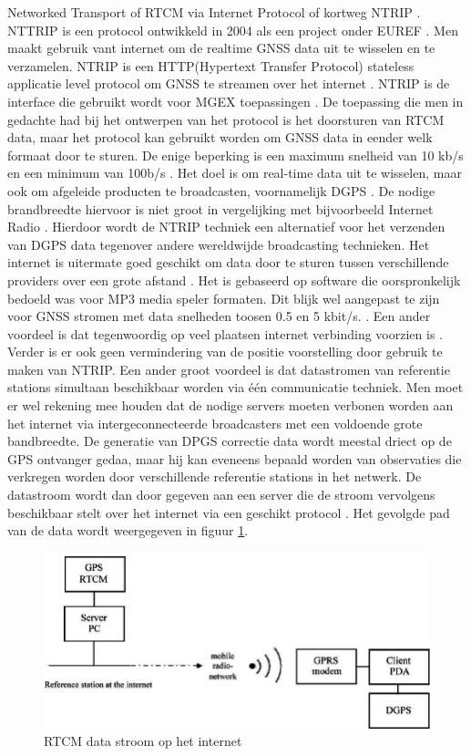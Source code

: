 Networked Transport of RTCM via Internet Protocol of kortweg NTRIP \cite{LBibNTRIP,LBibNTRIP3}. NTTRIP is een protocol ontwikkeld in 2004 \cite{LBibNTRIP3} als een project onder EUREF \cite{LBibNTRIP4}. Men maakt gebruik vant internet om de realtime GNSS data uit te wisselen en te verzamelen. NTRIP is een HTTP(Hypertext Transfer Protocol) stateless applicatie level protocol om GNSS te streamen over het internet \cite{LBibNTRIP}. NTRIP is de interface die gebruikt wordt voor MGEX toepassingen \cite{LBibGNSS9}. De toepassing die men in gedachte had bij het ontwerpen van het protocol is het doorsturen van RTCM data, maar het protocol kan gebruikt worden om GNSS data in eender welk formaat door te sturen. De enige beperking is een maximum snelheid van 10 kb/s en een minimum van 100b/s \cite{LBibNTRIP3}.  Het doel is om real-time data uit te wisselen, maar ook om afgeleide producten te broadcasten, voornamelijk DGPS \cite{LBibNTRIP2}. De nodige brandbreedte hiervoor is niet groot in vergelijking met bijvoorbeeld Internet Radio \cite{LBibNTRIP}. Hierdoor wordt de NTRIP techniek een alternatief voor het verzenden van DGPS data tegenover andere  wereldwijde broadcasting technieken. Het internet is uitermate goed geschikt om data door te sturen tussen verschillende providers over een grote afstand \cite{LBibNTRIP2}. Het is gebaseerd op software die oorspronkelijk bedoeld was voor MP3 media speler formaten. Dit blijk wel aangepast te zijn voor GNSS stromen met data snelheden toosen 0.5 en 5 kbit/s. \cite{LBibGPS}. Een ander voordeel is dat tegenwoordig op veel plaatsen internet verbinding voorzien is \cite{LBibNTRIP}. Verder is er ook geen vermindering van de positie voorstelling door gebruik te maken van NTRIP. Een ander groot voordeel is dat datastromen van referentie stations simultaan beschikbaar worden via \'e\'en communicatie techniek. Men moet er wel rekening mee houden dat de nodige servers moeten verbonen worden aan het internet via intergeconnecteerde broadcasters met een voldoende grote bandbreedte.  De generatie van DPGS correctie data wordt meestal driect op de GPS ontvanger gedaa, maar hij kan eveneens bepaald worden van observaties die verkregen worden door verschillende referentie stations in het netwerk. De datastroom wordt dan door gegeven aan een server die de stroom vervolgens beschikbaar stelt over het internet via een geschikt protocol \cite{LBibNTRIP2}. Het gevolgde pad van de data wordt weergegeven in figuur \ref{imgNTRIP2}.
\begin{figure}[hpb]
	\includegraphics[scale=0.4]{NTRIP2.png}
	\caption{RTCM data stroom op het internet \cite{LBibNTRIP2}}
	\label{imgNTRIP2}
\end{figure} 

